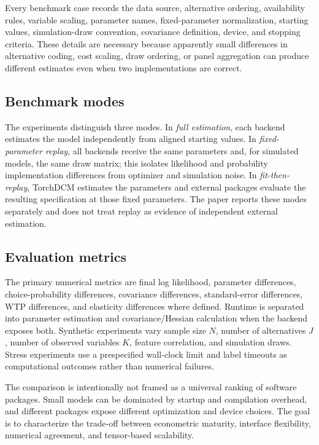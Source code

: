 \documentclass[11pt]{article}
\begin{document}
Every benchmark case records the data source, alternative ordering, availability
rules, variable scaling, parameter names, fixed-parameter normalization,
starting values, simulation-draw convention, covariance definition, device,
and stopping criteria. These details are necessary because apparently small
differences in alternative coding, cost scaling, draw ordering, or panel
aggregation can produce different estimates even when two implementations are
correct.

\subsection{Benchmark modes}

The experiments distinguish three modes. In \emph{full estimation}, each
backend estimates the model independently from aligned starting values. In
\emph{fixed-parameter replay}, all backends receive the same parameters and,
for simulated models, the same draw matrix; this isolates likelihood and
probability implementation differences from optimizer and simulation noise. In
\emph{fit-then-replay}, TorchDCM estimates the parameters and external packages
evaluate the resulting specification at those fixed parameters. The paper
reports these modes separately and does not treat replay as evidence of
independent external estimation.

\subsection{Evaluation metrics}

The primary numerical metrics are final log likelihood, parameter differences,
choice-probability differences, covariance differences, standard-error
differences, WTP differences, and elasticity differences where defined. Runtime
is separated into parameter estimation and covariance/Hessian calculation when
the backend exposes both. Synthetic experiments vary sample size $N$, number of
alternatives $J$, number of observed variables $K$, feature correlation, and
simulation draws. Stress experiments use a prespecified wall-clock limit and
label timeouts as computational outcomes rather than numerical failures.

The comparison is intentionally not framed as a universal ranking of software
packages. Small models can be dominated by startup and compilation overhead,
and different packages expose different optimization and device choices. The
goal is to characterize the trade-off between econometric maturity, interface
flexibility, numerical agreement, and tensor-based scalability.
\end{document}
